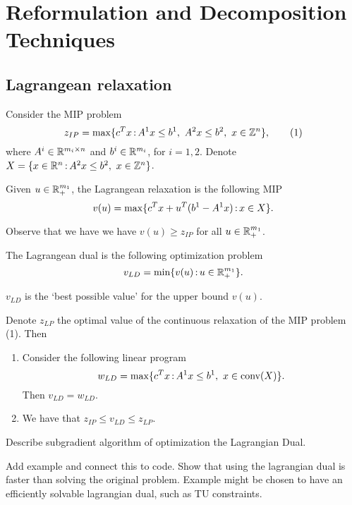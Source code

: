 \documentclass[../open-optimization/open-optimization.tex]{subfiles}
\begin{document}
\chapter{Reformulation and Decomposition Techniques}

\section{Lagrangean relaxation}

Consider the MIP problem
$$z_{IP}=\max \{ c^Tx{\,:\,} A^1x\leq b^1,\ A^2x\leq b^2,\ x\in{\mathbb{Z}}^n\},\qquad (1)$$
where $A^i\in{\mathbb{R}}^{m_i\times n}$ and $b^i\in{\mathbb{R}}^{m_i}$, for $i=1,2$. Denote $X=\{x\in\R^n\tq A^2x\leq b^2,\ x\in\Z^n\}$.

\begin{definition} Given $u\in{\mathbb{R}}^{m_1}_+$, the Lagrangean relaxation is the following MIP
$$v(u)=\max \{c^Tx+ u^T(b^1-A^1x){\,:\,} x\in X\}.$$
\end{definition}

\begin{remark}
Observe that we have  we have $v(u)\geq z_{IP}$ for all $u\in{\mathbb{R}}^{m_1}_+$.
\end{remark}

\begin{definition} The Lagrangean dual is the following optimization  problem
$$v_{LD}=\min\{v(u){\,:\,} u\in{\mathbb{R}}^{m_1}_+\}.$$
\end{definition}

\begin{remark}
$v_{LD}$ is the `best possible value' for the upper bound $v(u)$.
\end{remark}

\begin{theorem} Denote $z_{LP}$ the optimal value of the continuous relaxation of the MIP problem (1). Then
\begin{enumerate}
\item  Consider the following linear program
	$$w_{LD}=\max\{c^Tx\tq A^1x\leq b^1,\ x\in\conv(X)\}.$$
	Then $v_{LD}=w_{LD}$. 
	\item We have that $z_{IP}\leq v_{LD} \leq z_{LP}$.
\end{enumerate}
\end{theorem}

\begin{todo}
Describe subgradient algorithm of optimization the Lagrangian Dual.  
\end{todo}

\begin{todo}
Add example and connect this to code.  Show that using the lagrangian dual is faster than solving the original problem.  Example might be chosen to have an efficiently solvable lagrangian dual, such as TU constraints.
\end{todo}
\end{document}
